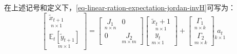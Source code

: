 在上述记号和定义下，\cref{eq-linear-ration-expectation-jordan-invH}可写为：
\begin{equation*}
    \begin{bmatrix}
        \underset{n\times 1}{\tilde{x}_{t+1}} \\
        \underset{m\times 1}{\mathbb{E}_t \left[\tilde{y}_{t+1}\right]}
    \end{bmatrix}
    =
    \begin{bmatrix}
        \underset{n\times n}{J_1} & 0 \\
        0 & \underset{m\times m}{J_2}
    \end{bmatrix}
    \begin{bmatrix}
        \underset{n\times 1}{\tilde{x}_t+1} \\
        \underset{m\times 1}{y_t}
    \end{bmatrix}
    +
    \begin{bmatrix}
        \underset{n\times k}{\Gamma_1} \\
        \underset{m\times k}{\Gamma_2}
    \end{bmatrix}
    \underset{k\times 1}{a_t}
\end{equation*}

